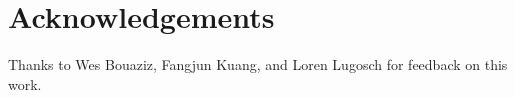 \section*{Acknowledgements}

Thanks to Wes Bouaziz, Fangjun Kuang, and Loren Lugosch for feedback on this
work.
